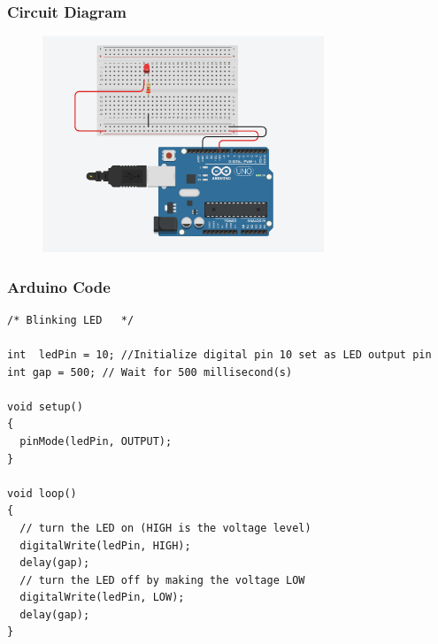 \pagebreak\subsubsection{Circuit Diagram}
        \begin{figure}[!ht]
            \centering
            \includegraphics[width =0.75\textwidth]{images/BlinkingLED.png}
        \end{figure}
            
\subsubsection{Arduino Code}
    \begin{lstlisting}[style = Arduino]
    /* Blinking LED   */

int  ledPin = 10; //Initialize digital pin 10 set as LED output pin
int gap = 500; // Wait for 500 millisecond(s)

void setup()
{
  pinMode(ledPin, OUTPUT);
}

void loop()
{
  // turn the LED on (HIGH is the voltage level)
  digitalWrite(ledPin, HIGH);
  delay(gap); 
  // turn the LED off by making the voltage LOW
  digitalWrite(ledPin, LOW);
  delay(gap);
}
    \end{lstlisting}
 

    
